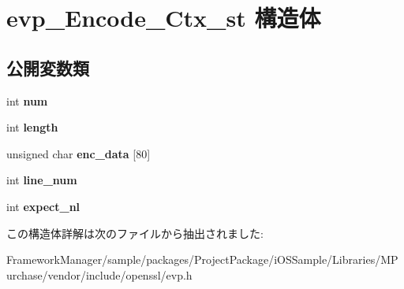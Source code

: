 \hypertarget{structevp___encode___ctx__st}{}\section{evp\+\_\+\+Encode\+\_\+\+Ctx\+\_\+st 構造体}
\label{structevp___encode___ctx__st}
\subsection*{公開変数類}
\begin{DoxyCompactItemize}
\item 
\hypertarget{structevp___encode___ctx__st_a7a68545e6131f26113bc316cb66e794d}{}int {\bfseries num}\label{structevp___encode___ctx__st_a7a68545e6131f26113bc316cb66e794d}

\item 
\hypertarget{structevp___encode___ctx__st_ab5409ce49d7af9d0320f5bd1c9bbdfd4}{}int {\bfseries length}\label{structevp___encode___ctx__st_ab5409ce49d7af9d0320f5bd1c9bbdfd4}

\item 
\hypertarget{structevp___encode___ctx__st_ab2465a57d3ee1c0d7efba8f278c81911}{}unsigned char {\bfseries enc\+\_\+data} \mbox{[}80\mbox{]}\label{structevp___encode___ctx__st_ab2465a57d3ee1c0d7efba8f278c81911}

\item 
\hypertarget{structevp___encode___ctx__st_a92d2880fa44acb614cff2005fe3d74e3}{}int {\bfseries line\+\_\+num}\label{structevp___encode___ctx__st_a92d2880fa44acb614cff2005fe3d74e3}

\item 
\hypertarget{structevp___encode___ctx__st_ae152066ba261286f7521992aefbfa952}{}int {\bfseries expect\+\_\+nl}\label{structevp___encode___ctx__st_ae152066ba261286f7521992aefbfa952}

\end{DoxyCompactItemize}


この構造体詳解は次のファイルから抽出されました\+:\begin{DoxyCompactItemize}
\item 
Framework\+Manager/sample/packages/\+Project\+Package/i\+O\+S\+Sample/\+Libraries/\+M\+Purchase/vendor/include/openssl/evp.\+h\end{DoxyCompactItemize}
